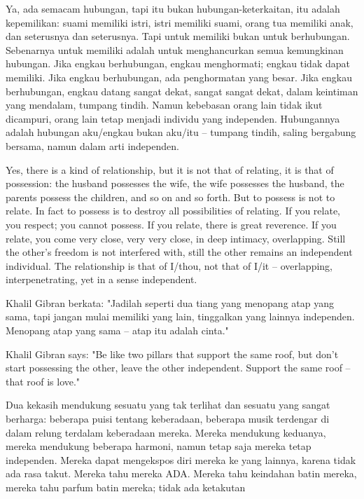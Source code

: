 \bahasa
Ya, ada semacam hubungan, tapi itu bukan hubungan-keterkaitan, itu adalah kepemilikan: suami memiliki istri, istri memiliki suami, orang tua memiliki anak, dan seterusnya dan seterusnya. Tapi untuk memiliki bukan untuk berhubungan. Sebenarnya untuk memiliki adalah untuk menghancurkan semua kemungkinan hubungan. Jika engkau berhubungan, engkau menghormati; engkau tidak dapat memiliki. Jika engkau berhubungan, ada penghormatan yang besar. Jika engkau berhubungan, engkau datang sangat dekat, sangat sangat dekat, dalam keintiman yang mendalam, tumpang tindih. Namun kebebasan orang lain tidak ikut dicampuri, orang lain tetap menjadi individu yang independen. Hubungannya adalah hubungan aku/engkau bukan aku/itu -- tumpang tindih, saling bergabung bersama, namun dalam arti independen.

\english
Yes, there is a kind of relationship, but it is not that of relating, it is that of possession: the husband possesses the wife, the wife possesses the husband, the parents possess the children, and so on and so forth. But to possess is not to relate. In fact to possess is to destroy all possibilities of relating. If you relate, you respect; you cannot possess. If you relate, there is great reverence. If you relate, you come very close, very very close, in deep intimacy, overlapping. Still the other's freedom is not interfered with, still the other remains an independent individual. The relationship is that of I/thou, not that of I/it -- overlapping, interpenetrating, yet in a sense independent.

\bahasa
Khalil Gibran berkata: "Jadilah seperti dua tiang yang menopang atap yang sama, tapi jangan mulai memiliki yang lain, tinggalkan yang lainnya independen. Menopang atap yang sama -- atap itu adalah cinta."

\english
Khalil Gibran says: "Be like two pillars that support the same roof, but don't start possessing the other, leave the other independent. Support the same roof -- that roof is love."

\bahasa
Dua kekasih mendukung sesuatu yang tak terlihat dan sesuatu yang sangat berharga: beberapa puisi tentang keberadaan, beberapa musik terdengar di dalam relung terdalam keberadaan mereka. Mereka mendukung keduanya, mereka mendukung beberapa harmoni, namun tetap saja mereka tetap independen. Mereka dapat mengekspos diri mereka ke yang lainnya, karena tidak ada rasa takut. Mereka tahu mereka ADA. Mereka tahu keindahan batin mereka, mereka tahu parfum batin mereka; tidak ada ketakutan

